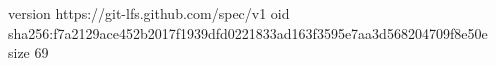 version https://git-lfs.github.com/spec/v1
oid sha256:f7a2129ace452b2017f1939dfd0221833ad163f3595e7aa3d568204709f8e50e
size 69
